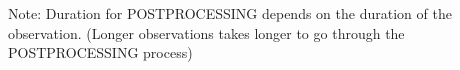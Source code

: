 Note: Duration for POSTPROCESSING depends on the duration of the observation. (Longer observations takes longer to go through the POSTPROCESSING process)






